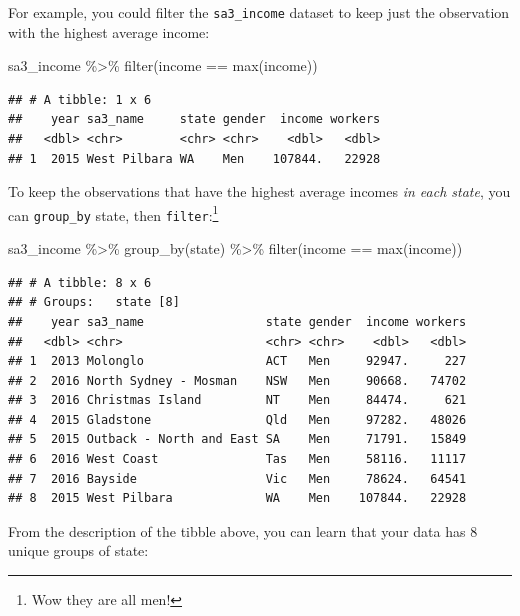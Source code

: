 \documentclass[
]{book}
\newenvironment{Shaded}{\begin{snugshade}}{\end{snugshade}}
\newcommand{\FunctionTok}[1]{\textcolor[rgb]{0.00,0.00,0.00}{#1}}
\newcommand{\NormalTok}[1]{#1}
\newcommand{\SpecialCharTok}[1]{\textcolor[rgb]{0.00,0.00,0.00}{#1}}
\begin{document}
For example, you could filter the \texttt{sa3\_income} dataset to keep just the observation with the highest average income:

\begin{Shaded}
\begin{Highlighting}[]
\NormalTok{sa3\_income }\SpecialCharTok{\%\textgreater{}\%} 
  \FunctionTok{filter}\NormalTok{(income }\SpecialCharTok{==} \FunctionTok{max}\NormalTok{(income))}
\end{Highlighting}
\end{Shaded}

\begin{verbatim}
## # A tibble: 1 x 6
##    year sa3_name     state gender  income workers
##   <dbl> <chr>        <chr> <chr>    <dbl>   <dbl>
## 1  2015 West Pilbara WA    Men    107844.   22928
\end{verbatim}

To keep the observations that have the highest average incomes \emph{in each state}, you can \texttt{group\_by} state, then \texttt{filter}:\footnote{Wow they are all men!}

\begin{Shaded}
\begin{Highlighting}[]
\NormalTok{sa3\_income }\SpecialCharTok{\%\textgreater{}\%} 
  \FunctionTok{group\_by}\NormalTok{(state) }\SpecialCharTok{\%\textgreater{}\%} 
  \FunctionTok{filter}\NormalTok{(income }\SpecialCharTok{==} \FunctionTok{max}\NormalTok{(income))}
\end{Highlighting}
\end{Shaded}

\begin{verbatim}
## # A tibble: 8 x 6
## # Groups:   state [8]
##    year sa3_name                 state gender  income workers
##   <dbl> <chr>                    <chr> <chr>    <dbl>   <dbl>
## 1  2013 Molonglo                 ACT   Men     92947.     227
## 2  2016 North Sydney - Mosman    NSW   Men     90668.   74702
## 3  2016 Christmas Island         NT    Men     84474.     621
## 4  2015 Gladstone                Qld   Men     97282.   48026
## 5  2015 Outback - North and East SA    Men     71791.   15849
## 6  2016 West Coast               Tas   Men     58116.   11117
## 7  2016 Bayside                  Vic   Men     78624.   64541
## 8  2015 West Pilbara             WA    Men    107844.   22928
\end{verbatim}

From the description of the tibble above, you can learn that your data has 8 unique groups of state:
\end{document}
